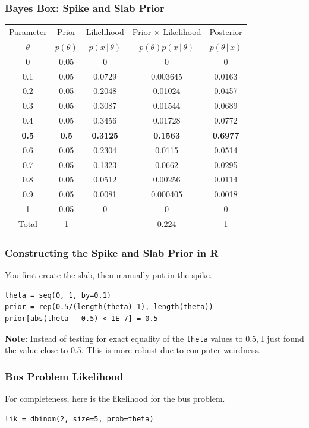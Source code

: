 \documentclass{beamer}
\newcommand{\given}{\,|\,}
\begin{document}
\begin{frame}
\frametitle{Bayes Box: Spike and Slab Prior}

\centering
{\footnotesize
\begin{tabular}{|c|c|c|c|c|}
\hline
Parameter & Prior & Likelihood & Prior $\times$ Likelihood & Posterior \\
$\theta$  & $p(\theta)$ & $p(x \given \theta)$ & $p(\theta)p(x\given \theta)$ & $p(\theta\given x)$ \\
\hline
0 & 0.05 & 0 & 0 & 0\\
0.1 & 0.05 & 0.0729  & 0.003645 & 0.0163\\
0.2 & 0.05 & 0.2048 & 0.01024  & 0.0457 \\
0.3 & 0.05 & 0.3087 & 0.01544 & 0.0689 \\
0.4 & 0.05 & 0.3456 & 0.01728 & 0.0772 \\
{\bf 0.5} & {\bf 0.5} & {\bf 0.3125} & {\bf 0.1563} & {\bf 0.6977} \\
0.6 & 0.05 & 0.2304 & 0.0115 & 0.0514 \\
0.7 & 0.05 & 0.1323 & 0.0662 & 0.0295 \\
0.8 & 0.05 & 0.0512 & 0.00256 & 0.0114 \\
0.9 & 0.05 & 0.0081 & 0.000405 & 0.0018 \\
1 & 0.05 & 0 & 0 & 0 \\
\hline
Total & 1 & & 0.224 & 1 \\
\hline
\end{tabular}
}

\end{frame}

\begin{frame}[fragile]
\frametitle{Constructing the Spike and Slab Prior in R}
You first create the slab, then manually put in the spike.

\begin{verbatim}
theta = seq(0, 1, by=0.1)
prior = rep(0.5/(length(theta)-1), length(theta))
prior[abs(theta - 0.5) < 1E-7] = 0.5
\end{verbatim}
\pause

{\bf Note}: Instead of testing for exact equality of the
\texttt{theta} values to 0.5, I just found the
value close to 0.5. This is more robust due to computer weirdness.
\end{frame}

\begin{frame}[fragile]
\frametitle{Bus Problem Likelihood}
For completeness, here is the likelihood for the bus problem.

\begin{verbatim}
lik = dbinom(2, size=5, prob=theta)
\end{verbatim}
\end{frame}
\end{document}
